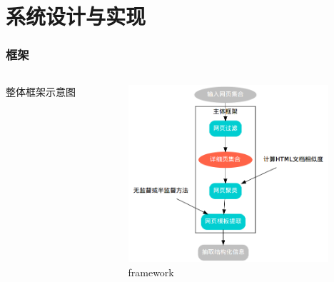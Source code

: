 \documentclass[11pt,presentation]{beamer}
\begin{document}
\section{系统设计与实现}
\label{sec-2}
\begin{frame}
\frametitle{框架}
\label{sec-2-1}
\begin{columns}[t]
\begin{column}{0.3\textwidth}
\label{sec-2-1-1}

整体框架示意图
\end{column}
\begin{column}{0.7\textwidth}
\label{sec-2-1-2}

    \begin{figure}[htb]
    \centering
    \includegraphics[width=20em,angle=0]{./framework.png}
    \caption{\label{fig:1}framework}
    \end{figure}
\end{column}
\end{columns}
\end{frame}
\end{document}
